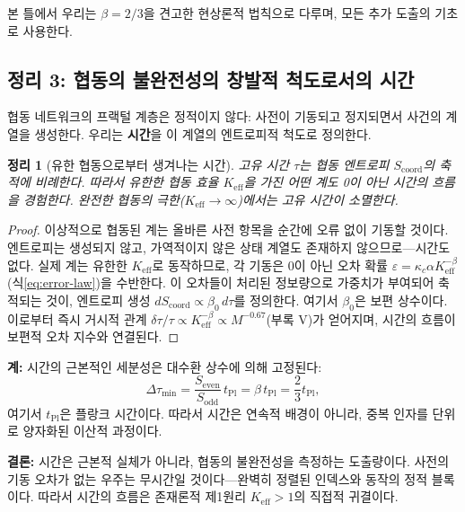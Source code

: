 \documentclass[12pt,a4paper]{article}
\newtheorem{theorem}{정리}[section]
\begin{document}
	본 틀에서 우리는 \(\beta = 2/3\)을 견고한 현상론적 법칙으로 다루며, 모든 추가 도출의 기초로 사용한다.
	
	\subsection{정리 3: 협동의 불완전성의 창발적 척도로서의 시간}
	\label{subsec:time-emergence}
	
	협동 네트워크의 프랙털 계층은 정적이지 않다: 사전이 기동되고 정지되면서 사건의 계열을 생성한다. 우리는 \textbf{시간}을 이 계열의 엔트로피적 척도로 정의한다.
	
	\begin{theorem}[유한 협동으로부터 생겨나는 시간]
		\label{thm:time}
		고유 시간 \(\tau\)는 협동 엔트로피 \(S_{\mathrm{coord}}\)의 축적에 비례한다. 따라서 유한한 협동 효율 \(K_{\mathrm{eff}}\)을 가진 어떤 계도 0이 아닌 시간의 흐름을 경험한다. 완전한 협동의 극한(\(K_{\mathrm{eff}} \to \infty\))에서는 고유 시간이 소멸한다.
	\end{theorem}
	
	\begin{proof}
		이상적으로 협동된 계는 올바른 사전 항목을 순간에 오류 없이 기동할 것이다. 엔트로피는 생성되지 않고, 가역적이지 않은 상태 계열도 존재하지 않으므로—시간도 없다. 실제 계는 유한한 \(K_{\mathrm{eff}}\)로 동작하므로, 각 기동은 0이 아닌 오차 확률 \(\varepsilon = \kappa_c \alpha K_{\mathrm{eff}}^{-\beta}\)(식\ref{eq:error-law})을 수반한다. 이 오차들이 처리된 정보량으로 가중치가 부여되어 축적되는 것이, 엔트로피 생성 \(dS_{\mathrm{coord}} \propto \beta_0 \, d\tau\)를 정의한다. 여기서 \(\beta_0\)은 보편 상수이다. 이로부터 즉시 거시적 관계 \(\delta\tau/\tau \propto K_{\mathrm{eff}}^{-\beta} \propto M^{-0.67}\)(부록 V)가 얻어지며, 시간의 흐름이 보편적 오차 지수와 연결된다.
	\end{proof}
	
	\noindent
	\textbf{계:} 시간의 근본적인 세분성은 대수환 상수에 의해 고정된다:
	\[
	\Delta \tau_{\min} = \frac{S_{\mathrm{even}}}{S_{\mathrm{odd}}} \, t_{\mathrm{Pl}}
	= \beta \, t_{\mathrm{Pl}} = \frac{2}{3} t_{\mathrm{Pl}},
	\]
	여기서 \(t_{\mathrm{Pl}}\)은 플랑크 시간이다. 따라서 시간은 연속적 배경이 아니라, 중복 인자를 단위로 양자화된 이산적 과정이다.
	
	\noindent
	\textbf{결론:} 시간은 근본적 실체가 아니라, 협동의 불완전성을 측정하는 도출량이다. 사전의 기동 오차가 없는 우주는 무시간일 것이다—완벽히 정렬된 인덱스와 동작의 정적 블록이다. 따라서 시간의 흐름은 존재론적 제1원리 \(K_{\mathrm{eff}} > 1\)의 직접적 귀결이다.
	
\end{document}
